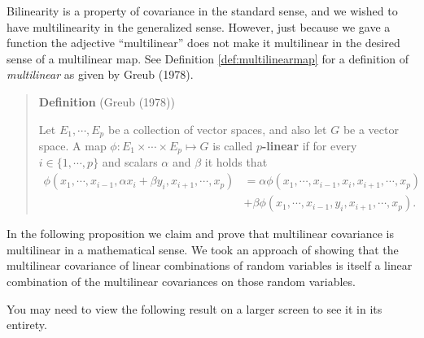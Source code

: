 \documentclass[
  letterpaper,
  DIV=11,
  numbers=noendperiod]{scrreprt}
\begin{document}
Bilinearity is a property of covariance in the standard sense, and we
wished to have multilinearity in the generalized sense. However, just
because we gave a function the adjective ``multilinear'' does not make
it multilinear in the desired sense of a multilinear map. See Definition
\ref{def:multilinearmap} for a definition of \emph{multilinear} as given
by Greub (1978).

\begin{quote}
\textbf{Definition} (Greub (1978))

Let \(E_1, \cdots, E_{p}\) be a collection of vector spaces, and also
let \(G\) be a vector space. A map
\(\phi: E_1 \times \cdots \times E_p \mapsto G\) is called
\textbf{\(p\)-linear} if for every \(i \in \{1, \cdots, p \}\) and
scalars \(\alpha\) and \(\beta\) it holds that \begin{align*}
\phi (x_1, \cdots, x_{i-1}, \alpha x_i + \beta y_i, x_{i+1}, \cdots, x_p) &= \alpha \phi (x_1, \cdots, x_{i-1}, x_i, x_{i+1}, \cdots, x_p) \\
&  + \beta \phi (x_1, \cdots, x_{i-1}, y_i, x_{i+1}, \cdots, x_p).
\end{align*}
\end{quote}

In the following proposition we claim and prove that multilinear
covariance is multilinear in a mathematical sense. We took an approach
of showing that the multilinear covariance of linear combinations of
random variables is itself a linear combination of the multilinear
covariances on those random variables.

\begin{tcolorbox}[enhanced jigsaw, colbacktitle=quarto-callout-caution-color!10!white, bottomrule=.15mm, left=2mm, arc=.35mm, bottomtitle=1mm, coltitle=black, breakable, rightrule=.15mm, toptitle=1mm, opacityback=0, titlerule=0mm, title=\textcolor{quarto-callout-caution-color}{\faFire}\hspace{0.5em}{Screen Size}, colframe=quarto-callout-caution-color-frame, toprule=.15mm, leftrule=.75mm, opacitybacktitle=0.6, colback=white]

You may need to view the following result on a larger screen to see it
in its entirety.

\end{tcolorbox}
\end{document}

